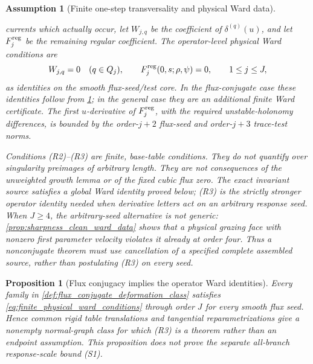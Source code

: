 \documentclass[11pt]{amsart}
\theoremstyle{compactplain}
\newtheorem{proposition}[theorem]{Proposition}
\theoremstyle{compactdefinition}
\newtheorem{assumption}[theorem]{Assumption}
\theoremstyle{compactremark}
\begin{document}
\begin{assumption}[Finite one-step transversality and physical Ward data]
\begin{enumerate}[label=\textup{(R\arabic*)},wide,labelindent=0pt]
  currents which actually occur, let \(W_{j,q}\) be the coefficient of
  \(\delta^{(q)}(u)\), and let \(F^{\rm reg}_j\) be the remaining regular
  coefficient.  The operator-level physical Ward conditions are
  \begin{equation}
  \label{eq:finite_physical_ward_conditions}
    W_{j,q}=0\quad(q\in Q_j),
    \qquad F^{\rm reg}_j(0,s;\rho,\psi)=0,
    \qquad 1\le j\le J,
  \end{equation}
  as identities on the smooth flux-seed/test core.  In the flux-conjugate case
  these identities follow from \cref{prop:flux_conjugacy_implies_operator_ward};
  in the general case they are an additional finite Ward certificate.  The first \(u\)-derivative
  of \(F_j^{\rm reg}\), with the required unstable-holonomy differences, is
  bounded by the order-\(j+2\) flux-seed and order-\(j+3\) trace-test norms.
\end{enumerate}
Conditions (R2)--(R3) are finite, base-table conditions.  They do not quantify
over singularity preimages of arbitrary length.  They are not consequences of
the unweighted growth lemma or of the fixed cubic flux zero.  The exact
invariant source satisfies a global Ward identity proved below; (R3) is the
strictly stronger operator identity needed when derivative letters act on an
arbitrary response seed.  When \(J\ge4\), the arbitrary-seed alternative is
not generic: \cref{prop:sharpness_clean_ward_data} shows that a physical
grazing face with nonzero first parameter velocity violates it already at
order four.  Thus a nonconjugate theorem must use cancellation of a specified
complete assembled source, rather than postulating (R3) on every seed.
\end{assumption}

\begin{proposition}[Flux conjugacy implies the operator Ward identities]
\label{prop:flux_conjugacy_implies_operator_ward}
Every family in \cref{def:flux_conjugate_deformation_class} satisfies
\eqref{eq:finite_physical_ward_conditions} through order \(J\) for every smooth
flux seed.  Hence common rigid table translations and tangential
reparametrizations give a nonempty normal-graph class for which (R3) is a
theorem rather than an endpoint assumption.  This proposition does not prove
the separate all-branch response-scale bound (S1).
\end{proposition}
\end{document}

